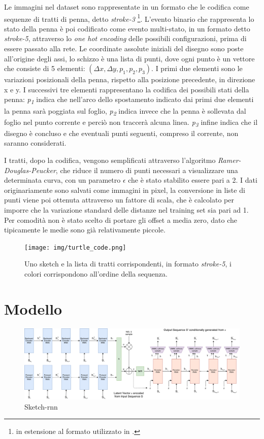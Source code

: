 Le immagini nel dataset sono rappresentate in un formato che le codifica come sequenze di tratti di penna, detto \textit{stroke-3} \footnote{in estensione al formato utilizzato in \cite{sequence}.}. L'evento binario che rappresenta lo stato della penna è poi codificato come evento multi-stato, in un formato detto \textit{stroke-5}, attraverso lo \textit{one hot encoding} delle possibili configurazioni, prima di essere passato alla rete. Le coordinate assolute iniziali del disegno sono poste all'origine degli assi, lo schizzo è una lista di punti, dove ogni punto è un vettore che consiste di 5 elementi: $(\Delta x, \Delta y, p_1, p_2, p_3)$. I primi due elementi sono le variazioni posizionali della penna, rispetto alla posizione precedente, in direzione x e y. I successivi tre elementi rappresentano la codifica dei possibili stati della penna: \textit{p\textsubscript{1}} indica che nell'arco dello spostamento indicato dai primi due elementi la penna sarà poggiata sul foglio, \textit{p\textsubscript{2}} indica invece che la penna è sollevata dal foglio nel punto corrente e perciò non traccerà alcuna linea. \textit{p\textsubscript{3}} infine indica che il disegno è concluso e che eventuali punti seguenti, compreso il corrente, non saranno considerati.

I tratti, dopo la codifica, vengono semplificati attraverso l'algoritmo \textit{Ramer-Douglas-Peucker}\cite{rdp}, che riduce il numero di punti necessari a visualizzare una determinata curva, con un parametro $\epsilon$ che è stato stabilito essere pari a 2. I dati originariamente sono salvati come immagini in pixel, la conversione in liste di punti viene poi ottenuta attraverso un fattore di scala, che è calcolato per imporre che la variazione standard delle distanze nel training set sia pari ad 1. Per comodità non è stato scelto di portare gli offset a media zero, dato che tipicamente le medie sono già relativamente piccole.
\begin{figure}[ht]
	\centering
	\texttt{[image: img/turtle\_code.png]}
	\caption{Uno sketch e la lista di tratti corrispondenti, in formato \textit{stroke-5}, i colori corrispondono all'ordine della sequenza.}
	\label{fig:1.18}
\end{figure}
\section{Modello} %
\label{sec:modello}
\begin{figure}[ht]
	\centering
	\includegraphics[width=\linewidth]{img/sketch_model.png}
	\caption{Sketch-rnn}
	\label{fig:1.15}
\end{figure}

